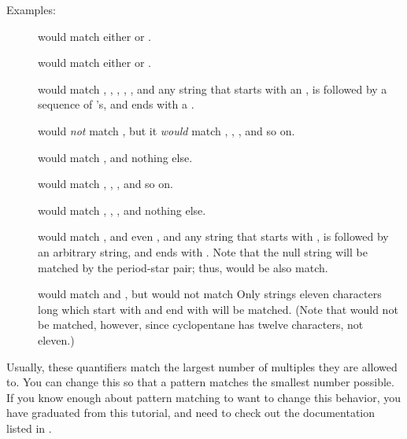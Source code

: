 \documentclass{dods-book}
\begin{document}
Examples:

\begin{description}
\item[] would match either  or
  .  

\item[] would match either  or .
  
\item[] would match , , ,
  , , and any string that starts with an
  , is followed by a sequence of 's, and ends with a
  .

\item[] would \emph{not} match , but it \emph{would}
  match , , ,  and so
  on.

\item[] would match , and nothing else.
  
\item[] would match , ,
  , and so on.

\item[] would match , ,
  , and nothing else.
  
\item[] would match ,
   and even , and any
  string that starts with , is followed by an arbitrary
  string, and ends with .  Note that the null string will be
  matched by the period-star pair; thus,  would be also
  match.
  
\item[] would match  and
  , but would not match   Only strings eleven characters long which start with
   and end with  will be matched. (Note that
   would not be matched, however, since cyclopentane
  has twelve characters, not eleven.)

\end{description}

Usually, these quantifiers match the largest number of multiples they
are allowed to.  You can change this so that a pattern matches the
smallest number possible. If you know enough about pattern matching to
want to change this behavior, you have graduated from this tutorial,
and need to check out the documentation listed in
.
\end{document}
